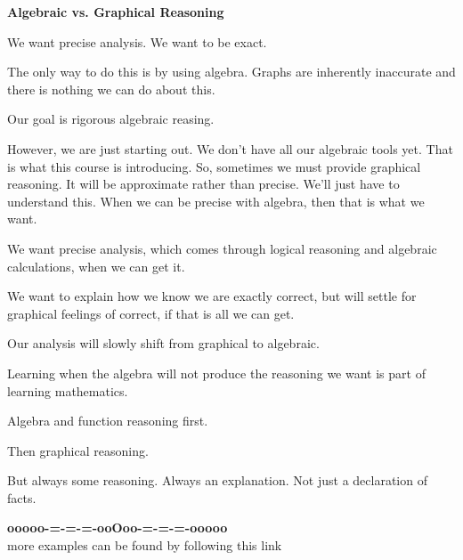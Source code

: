 \documentclass{ximera}
\begin{document}
\begin{warning}  \textbf{\textcolor{red!70!black}{Algebraic vs. Graphical Reasoning}}


We want precise analysis.  We want to be exact. 


The only way to do this is by using algebra.  Graphs are inherently inaccurate and there is nothing we can do about this. 


Our goal is rigorous algebraic reasing. 



However, we are just starting out.  We don't have all our algebraic tools yet.  That is what this course is introducing.  So, sometimes we must provide graphical reasoning.  It will be approximate rather than precise.  We'll just have to understand this.  When we can be precise with algebra, then that is what we want. 


We want precise analysis, which comes through logical reasoning and algebraic calculations, when we can get it. 


We want to explain how we know we are exactly correct, but will settle for graphical feelings of correct, if that is all we can get. 

Our analysis will slowly shift from graphical to algebraic.


\end{warning}



Learning when the algebra will not produce the reasoning we want is part of learning mathematics.  

Algebra and function reasoning first. 

Then graphical reasoning.  


But always some reasoning.  Always an explanation. Not just a declaration of facts.








\begin{onlineOnly}
\begin{center}
\textbf{\textcolor{green!50!black}{ooooo-=-=-=-ooOoo-=-=-=-ooooo}} \\

more examples can be found by following this link\\ 

\end{center}
\end{onlineOnly}
\end{document}

